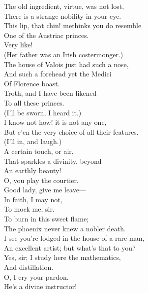 \documentclass[a4paper,oneside,12pt]{memoir}
\begin{document}
\begin{drama*}
The old ingredient, virtue, was not lost,\\
There is a strange nobility in your eye.\\
This lip, that chin! methinks you do resemble\\
One of the Austriac princes.\\
\facespeaks {} Very like!\\
(Her father was an Irish costermonger.)\\
\mammonspeaks The house of Valois just had such a nose,\\
And such a forehead yet the Medici\\
Of Florence boast.\\
\dolspeaks {} Troth, and I have been likened\\
To all these princes.\\
\facespeaks {} (I'll be sworn, I heard it.)\\
\mammonspeaks I know not how! it is not any one,\\
But e'en the very choice of all their features.\\
\facespeaks (I'll in, and laugh.)\\
\mammonspeaks {} A certain touch, or air,\\
That sparkles a divinity, beyond\\
An earthly beauty!\\
\dolspeaks {} O, you play the courtier.\\
\mammonspeaks Good lady, give me leave---\\
\dolspeaks {} In faith, I may not,\\
To mock me, sir.\\
\mammonspeaks {} To burn in this sweet flame;\\
The phoenix never knew a nobler death.\\
I see you're lodged in the house of a rare man,\\
An excellent artist; but what's that to you?\\
\dolspeaks Yes, sir; I study here the mathematics,\\
And distillation.\\
\mammonspeaks {} O, I cry your pardon.\\
He's a divine instructor!

\end{drama*}
\end{document}
